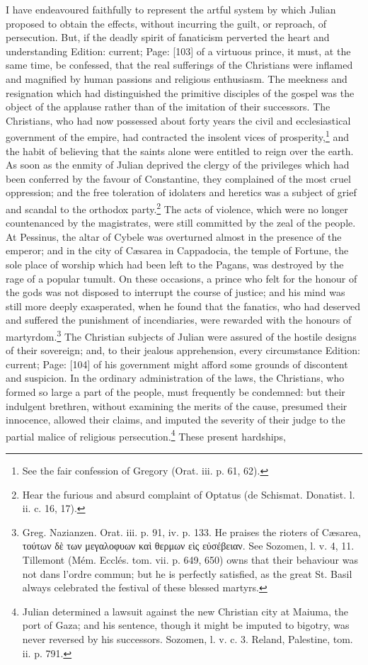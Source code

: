 I have endeavoured faithfully to represent the artful system by which Julian proposed to obtain the effects, without incurring the guilt, or reproach, of persecution. But, if the deadly spirit of fanaticism perverted the heart and understanding Edition: current; Page: [103] of a virtuous prince, it must, at the same time, be confessed, that the real sufferings of the Christians were inflamed and magnified by human passions and religious enthusiasm. The meekness and resignation which had distinguished the primitive disciples of the gospel was the object of the applause rather than of the imitation of their successors. The Christians, who had now possessed about forty years the civil and ecclesiastical government of the empire, had contracted the insolent vices of prosperity,\footnote{See the fair confession of Gregory (Orat. iii. p. 61, 62).} and the habit of believing that the saints alone were entitled to reign over the earth. As soon as the enmity of Julian deprived the clergy of the privileges which had been conferred by the favour of Constantine, they complained of the most cruel oppression; and the free toleration of idolaters and heretics was a subject of grief and scandal to the orthodox party.\footnote{Hear the furious and absurd complaint of Optatus (de Schismat. Donatist. l. ii. c. 16, 17).} The acts of violence, which were no longer countenanced by the magistrates, were still committed by the zeal of the people. At Pessinus, the altar of Cybele was overturned almost in the presence of the emperor; and in the city of Cæsarea in Cappadocia, the temple of Fortune, the sole place of worship which had been left to the Pagans, was destroyed by the rage of a popular tumult. On these occasions, a prince who felt for the honour of the gods was not disposed to interrupt the course of justice; and his mind was still more deeply exasperated, when he found that the fanatics, who had deserved and suffered the punishment of incendiaries, were rewarded with the honours of martyrdom.\footnote{Greg. Nazianzen. Orat. iii. p. 91, iv. p. 133. He praises the rioters of Cæsarea, \textgreek{τούτων δ\texthebrew{ὲ} των μεγαλοφυων κα\texthebrew{ὶ} θερμων ε\texthebrew{ὶ}ς ε\texthebrew{ὐ}σέβειαν}. See Sozomen, l. v. 4, 11. Tillemont (Mém. Ecclés. tom. vii. p. 649, 650) owns that their behaviour was not dans l\texthebrew{}’ordre commun; but he is perfectly satisfied, as the great St. Basil always celebrated the festival of these blessed martyrs.} The Christian subjects of Julian were assured of the hostile designs of their sovereign; and, to their jealous apprehension, every circumstance Edition: current; Page: [104] of his government might afford some grounds of discontent and suspicion. In the ordinary administration of the laws, the Christians, who formed so large a part of the people, must frequently be condemned: but their indulgent brethren, without examining the merits of the cause, presumed their innocence, allowed their claims, and imputed the severity of their judge to the partial malice of religious persecution.\footnote{Julian determined a lawsuit against the new Christian city at Maiuma, the port of Gaza; and his sentence, though it might be imputed to bigotry, was never reversed by his successors. Sozomen, l. v. c. 3. Reland, Palestine, tom. ii. p. 791.} These present hardships, 